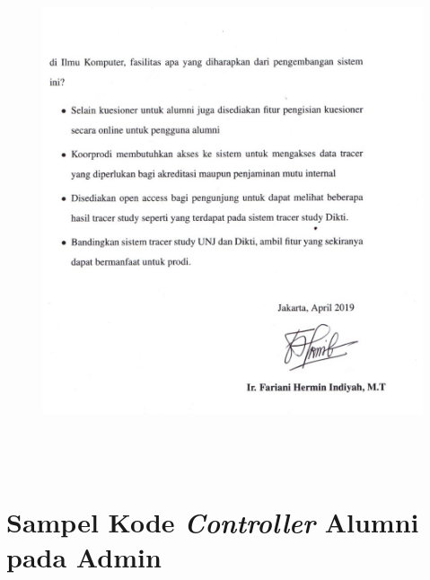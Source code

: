 \begin{figure}[H]
	\centering
	\includegraphics[width=16cm, height=15cm]{gambar/analisiskebutuhan2}
	\label{analisis1}
\end{figure}



\chapter{Sampel Kode \textit{Controller} Alumni pada Admin}

